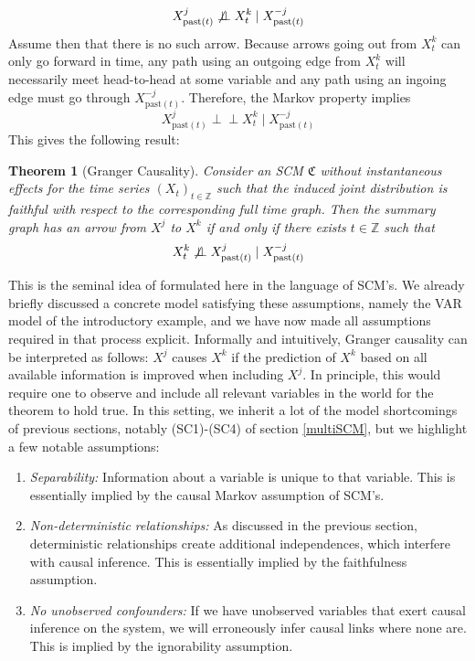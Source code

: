 \documentclass[11pt, a4paper]{memoir}
\theoremstyle{break}
\newtheorem{thm}{Theorem}
\theoremstyle{break}
\theoremstyle{nonumberplain}
\newcommand{\mZ}{\mathbb{Z}}
\newcommand{\indep}{\perp \!\!\! \perp}
\begin{document}
$$X^j_{\text{past}(t)}\centernot\indep X_t^k\mid X^{-j}_{\text{past}(t)}$$
Assume then that there is no such arrow. Because arrows going out from $X_t^k$ can only go forward in time, any path using an outgoing edge from $X_t^k$ will necessarily meet head-to-head at some variable and any path using an ingoing edge must go through $X^{-j}_{\text{past}(t)}$. Therefore, the Markov property implies 
$$X^j_{\text{past}(t)}\indep X_t^k\mid X^{-j}_{\text{past}(t)}$$
This gives the following result:
\begin{thm}[Granger Causality]
Consider an SCM $\mathfrak{C}$ without instantaneous effects for the time series $(X_t)_{t\in \mZ}$ such that the induced joint distribution is faithful with respect to the corresponding full time graph. Then the summary graph has an arrow from $X^j$ to $X^k$ if and only if there exists $t\in \mZ$ such that
$$X^k_t\centernot\indep X_{\text{past}(t)}^j\mid X^{-j}_{\text{past}(t)}$$
\end{thm}
This is the seminal idea of \cite{Granger} formulated here in the language of SCM's. We already briefly discussed a concrete model satisfying these assumptions, namely the VAR model of the introductory example, and we have now made all assumptions required in that process explicit.
Informally and intuitively, Granger causality can be interpreted as follows: $X^j$ causes $X^k$ if the prediction of $X^k$ based on all available information is improved when including $X^j$. In principle, this would require one to observe and include all relevant variables in the world for the theorem to hold true. In this setting, we inherit a lot of the model shortcomings of previous sections, notably (SC1)-(SC4) of section \ref{multiSCM}, but we highlight a few notable assumptions:
\begin{enumerate}[itemindent=15pt,label=(GC\arabic*)]
	\item \emph{Separability:} Information about a variable is unique to that variable. This is essentially implied by the causal Markov assumption of SCM's.
	\item \emph{Non-deterministic relationships:} As discussed in the previous section, deterministic relationships create additional independences, which interfere with causal inference. This is essentially implied by the faithfulness assumption.
	\item \emph{No unobserved confounders:} If we have unobserved variables that exert causal inference on the system, we will erroneously infer causal links where none are. This is implied by the ignorability assumption.
\end{enumerate}
\end{document}
